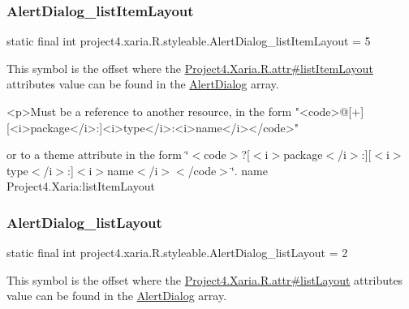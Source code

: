 \subsubsection{\texorpdfstring{Alert\+Dialog\+\_\+list\+Item\+Layout}{AlertDialog\_listItemLayout}}
{\footnotesize\ttfamily static final int project4.\+xaria.\+R.\+styleable.\+Alert\+Dialog\+\_\+list\+Item\+Layout = 5\hspace{0.3cm}{\ttfamily [static]}}

This symbol is the offset where the \hyperlink{}{Project4.\+Xaria.\+R.\+attr\#list\+Item\+Layout} attribute\textquotesingle{}s value can be found in the \hyperlink{classproject4_1_1xaria_1_1R_1_1styleable_a03310da91bbeadbad8196e09427a2ba7}{Alert\+Dialog} array.

\begin{DoxyVerb}      <p>Must be a reference to another resource, in the form "<code>@[+][<i>package</i>:]<i>type</i>:<i>name</i></code>"
\end{DoxyVerb}
 or to a theme attribute in the form \char`\"{}$<$code$>$?\mbox{[}$<$i$>$package$<$/i$>$\+:\mbox{]}\mbox{[}$<$i$>$type$<$/i$>$\+:\mbox{]}$<$i$>$name$<$/i$>$$<$/code$>$\char`\"{}.  name Project4.\+Xaria\+:list\+Item\+Layout \mbox{\label{classproject4_1_1xaria_1_1R_1_1styleable_a263c5c915bd8c850ce36810a7867291f}} 
\subsubsection{\texorpdfstring{Alert\+Dialog\+\_\+list\+Layout}{AlertDialog\_listLayout}}
{\footnotesize\ttfamily static final int project4.\+xaria.\+R.\+styleable.\+Alert\+Dialog\+\_\+list\+Layout = 2\hspace{0.3cm}{\ttfamily [static]}}

This symbol is the offset where the \hyperlink{}{Project4.\+Xaria.\+R.\+attr\#list\+Layout} attribute\textquotesingle{}s value can be found in the \hyperlink{classproject4_1_1xaria_1_1R_1_1styleable_a03310da91bbeadbad8196e09427a2ba7}{Alert\+Dialog} array.


